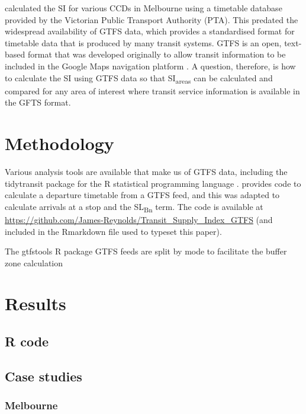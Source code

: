 \documentclass[numbered]{trbunofficial}
\begin{document}
\citet{currie2007identifying} calculated the SI for various CCDs in
Melbourne using a timetable database provided by the Victorian Public
Transport Authority (PTA). This predated the widespread availability of
GTFS data, which provides a standardised format for timetable data that
is produced by many transit systems. GTFS is an open, text-based format
that was developed originally to allow transit information to be
included in the Google Maps navigation platform \citep{GTFS}. A
question, therefore, is how to calculate the SI using GTFS data so that
SI\textsubscript{areas} can be calculated and compared for any area of
interest where transit service information is available in the GFTS
format.

\hypertarget{methodology}{%
\section{Methodology}\label{methodology}}

Various analysis tools are available that make us of GTFS data,
including the tidytransit package \citep{tidytransit2023} for the R
statistical programming language \citep{R-base}.
\citet{tidytransit_departure_timetable} provides code to calculate a
departure timetable from a GTFS feed, and this was adapted to calculate
arrivals at a stop and the SL\textsubscript{Bn} term. The code is
available at
\url{https://github.com/James-Reynolds/Transit_Supply_Index_GTFS} (and
included in the Rmarkdown file used to typeset this paper).

The gtfstools R package GTFS feeds are split by mode to facilitate the
buffer zone calculation

\hypertarget{results}{%
\section{Results}\label{results}}

\hypertarget{r-code}{%
\subsection{R code}\label{r-code}}

\hypertarget{case-studies}{%
\subsection{Case studies}\label{case-studies}}

\hypertarget{melbourne}{%
\subsubsection{Melbourne}\label{melbourne}}
\end{document}

